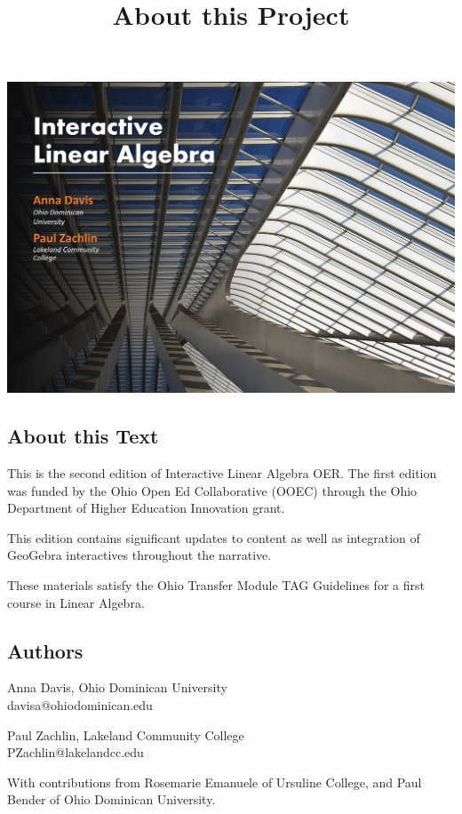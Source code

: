 \documentclass{ximera}
\title{About this Project} \license{CC-BY 4.0}
\begin{document}
\begin{abstract}
\end{abstract}
\maketitle

\begin{image}
\includegraphics{BookCover.jpg}
\end{image}

\subsection{About this Text}
This is the second edition of Interactive Linear Algebra OER.  The first edition was funded by the Ohio Open Ed Collaborative (OOEC) through the Ohio Department of Higher Education Innovation grant. 

This edition contains significant updates to content as well as integration of GeoGebra interactives throughout the narrative.

These materials satisfy the Ohio Transfer Module TAG Guidelines for a first course in Linear Algebra.  

\subsection{Authors}
Anna Davis, Ohio Dominican University\\
davisa@ohiodominican.edu

Paul Zachlin, Lakeland Community College\\
PZachlin@lakelandcc.edu

With contributions from Rosemarie Emanuele of Ursuline College, and Paul Bender of Ohio Dominican University.
\end{document}
